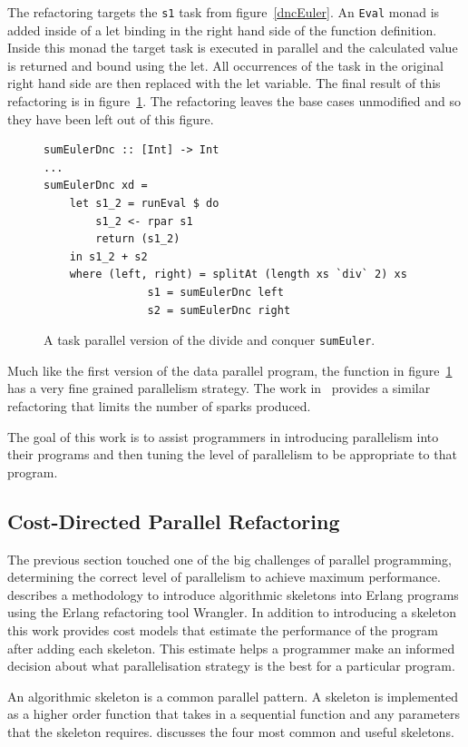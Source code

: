 The refactoring targets the \texttt{s1} task from figure~\ref{dncEuler}. An \texttt{Eval} monad is added inside of a let binding in the right hand side of the function definition. Inside this monad the target task is executed in parallel and the calculated value is returned and bound using the let. All occurrences of the task in the original right hand side are then replaced with the let variable. The final result of this refactoring is in figure~\ref{dncPar}. The refactoring leaves the base cases unmodified and so they have been left out of this figure.

\begin{figure}[t]\label{dncPar}
\begin{lstlisting}
sumEulerDnc :: [Int] -> Int
...
sumEulerDnc xd = 
	let s1_2 = runEval $ do
		s1_2 <- rpar s1
		return (s1_2)
	in s1_2 + s2
	where (left, right) = splitAt (length xs `div` 2) xs
				s1 = sumEulerDnc left
				s2 = sumEulerDnc right
\end{lstlisting}
\caption{A task parallel version of the divide and conquer \texttt{sumEuler}.}
\end{figure}

Much like the first version of the data parallel program, the function in figure~\ref{dncPar} has a very fine grained parallelism strategy. The work in~\citep{paraforming} provides a similar refactoring that limits the number of sparks produced.

The goal of this work is to assist programmers in introducing parallelism into their programs and then tuning the level of parallelism to be appropriate to that program.  

\subsection{Cost-Directed Parallel Refactoring}

The previous section touched one of the big challenges of parallel programming, determining the correct level of parallelism to achieve maximum performance. \citep{parallelErl} describes a methodology to introduce algorithmic skeletons into Erlang programs using the Erlang refactoring tool Wrangler. In addition to introducing a skeleton this work provides cost models that estimate the performance of the program after adding each skeleton. This estimate helps a programmer make an informed decision about what parallelisation strategy is the best for a particular program. 

An algorithmic skeleton is a common parallel pattern. A skeleton is implemented as a higher order function that takes in a sequential function and any parameters that the skeleton requires. \citep{parallelErl} discusses the four most common and useful skeletons.

